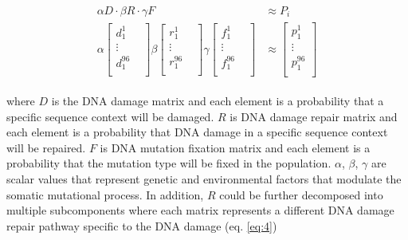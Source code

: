 \begin{align}
\begin{split} 
\alpha D \cdot \beta R \cdot \gamma F &\approx P_{i} \label{eq:3} \\
\alpha \begin{bmatrix}
    d^{1}_{1}  \\
    \vdots &  \\
    d^{96}_{1}  \\
\end{bmatrix} 
\beta \begin{bmatrix}
    r^{1}_{1} \\
    \vdots &  \\
    r^{96}_{1} \\
\end{bmatrix} 
\gamma \begin{bmatrix}
    f^{1}_{1}  \\
    \vdots &  \\
    f^{96}_{1}  \\
\end{bmatrix} &\approx
\begin{bmatrix}
    p^{1}_{1} \\
    \vdots \\
    p^{96}_{1} \\
\end{bmatrix}
\end{split}
\end{align}

where $D$ is the DNA damage matrix and each element is a probability that a specific sequence context will be damaged. $R$ is DNA damage repair matrix and each element is a probability that DNA damage in a specific sequence context will be repaired. $F$ is DNA mutation fixation matrix and each element is a probability that the mutation type will be fixed in the population. $\alpha$, $\beta$, $\gamma$ are scalar values that represent genetic and environmental factors that modulate the somatic mutational process. In addition, $R$ could be further decomposed into multiple subcomponents where each matrix represents a different DNA damage repair pathway specific to the DNA damage (eq. \ref{eq:4})

